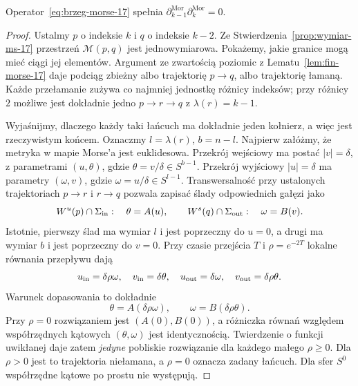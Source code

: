 \begin{twierdzenie}[Dlaczego $\partial^2=0$]
\label{thm:brzeg-morse-17}
Operator~\eqref{eq:brzeg-morse-17}
spełnia
$\partial^{\mathrm{Mor}}_{k-1}
 \partial^{\mathrm{Mor}}_k=0$.
\end{twierdzenie}
\begin{proof}
Ustalmy $p$ o indeksie $k$
i $q$ o indeksie $k-2$.
Ze Stwierdzenia~\ref{prop:wymiar-ms-17}
przestrzeń $\mathcal M(p,q)$
jest jednowymiarowa.
Pokażemy, jakie granice
mogą mieć ciągi jej elementów.
Argument ze zwartością
poziomic z
Lematu~\ref{lem:fin-morse-17}
daje podciąg zbieżny
albo trajektorię $p\to q$,
albo trajektorię łamaną.
Każde przełamanie zużywa
co najmniej jednostkę
różnicy indeksów; przy
różnicy $2$ możliwe
jest dokładnie jedno
$p\to r\to q$ z
$\lambda(r)=k-1$.

Wyjaśnijmy, dlaczego każdy taki łańcuch ma
dokładnie jeden kołnierz, a więc jest rzeczywistym końcem.
Oznaczmy $l=\lambda(r)$, $b=n-l$.
Najpierw załóżmy, że metryka w mapie Morse'a jest euklidesowa.
Przekrój wejściowy ma postać $|v|=\delta$, z parametrami
$(u,\theta)$, gdzie $\theta=v/\delta\in S^{b-1}$.
Przekrój wyjściowy $|u|=\delta$ ma parametry
$(\omega,v)$, gdzie $\omega=u/\delta\in S^{l-1}$.
Transwersalność przy ustalonych trajektoriach $p\to r$
i $r\to q$ pozwala zapisać ślady odpowiednich gałęzi jako
\[
 W^u(p)\cap\Sigma_{\rm in}:\quad\theta=A(u),
 \qquad
 W^s(q)\cap\Sigma_{\rm out}:\quad\omega=B(v).
\]
Istotnie, pierwszy ślad ma wymiar $l$ i jest
poprzeczny do $u=0$, a drugi ma wymiar $b$
i jest poprzeczny do $v=0$.
Przy czasie przejścia $T$ i $\rho=e^{-2T}$
lokalne równania przepływu dają
\[
 u_{\rm in}=\delta\rho\omega,\quad
 v_{\rm in}=\delta\theta,\quad
 u_{\rm out}=\delta\omega,\quad
 v_{\rm out}=\delta\rho\theta.
\]
Warunek dopasowania to dokładnie
\begin{equation}\label{eq:sklejanie-morse-17}
 \theta=A(\delta\rho\omega),\qquad
 \omega=B(\delta\rho\theta).
\end{equation}
Przy $\rho=0$ rozwiązaniem jest $(A(0),B(0))$,
a różniczka równań względem współrzędnych kątowych
$(\theta,\omega)$ jest identycznością.
Twierdzenie o funkcji uwikłanej daje zatem
\emph{jedyne} pobliskie rozwiązanie dla każdego małego
$\rho\geq0$. Dla $\rho>0$ jest to trajektoria niełamana,
a $\rho=0$ oznacza zadany łańcuch.
Dla sfer $S^0$ współrzędne kątowe po prostu nie występują.


\end{proof}
